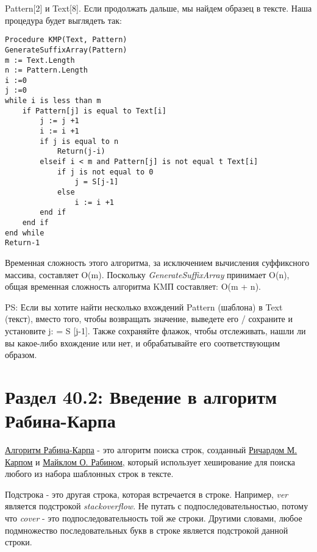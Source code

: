 Pattern[2] и Text[8]. Если продолжать дальше, мы найдем образец в тексте. Наша процедура
будет выглядеть так:
\vspace{\baselineskip}
\begin{tcolorbox}
\begin{verbatim}
Procedure KMP(Text, Pattern)
GenerateSuffixArray(Pattern)
m := Text.Length
n := Pattern.Length
i :=0
j :=0
while i is less than m
	if Pattern[j] is equal to Text[i]
		j := j +1
		i := i +1
		if j is equal to n
			Return(j-i)
		elseif i < m and Pattern[j] is not equal t Text[i]
			if j is not equal to 0
				j = S[j-1]
			else
				i := i +1
		end if
	end if
end while
Return-1
\end{verbatim}
\end{tcolorbox}
\vspace{\baselineskip}
Временная сложность этого алгоритма, за исключением вычисления суффиксного массива,
составляет O(m). Поскольку \textit{GenerateSuffixArray} принимает O(n), общая временная сложность
алгоритма KMП составляет: O(m + n).
\vspace{\baselineskip}

PS: Если вы хотите найти несколько вхождений Pattern (шаблона) в Text (текст), вместо того,
чтобы возвращать значение, выведете его / сохраните и установите j: = S [j-1]. Также
сохраняйте флажок, чтобы отслеживать, нашли ли вы какое-либо вхождение или нет, и
обрабатывайте его соответствующим образом.

\section*{Раздел 40.2: Введение в алгоритм Рабина-Карпа}
\href{https://en.wikipedia.org/wiki/Rabin%
}{\underline{Алгоритм Рабина-Карпа}}
- это алгоритм поиска строк, созданный \href{https://en.wikipedia.org/wiki/Richard_M._Karp}{\underline{Ричардом М. Карпом}} и \newline
\href{https://en.wikipedia.org/wiki/Michael_O._Rabin}{\underline{Майклом О. Рабином}}, который использует хеширование для поиска любого из набора
шаблонных строк в тексте.
\vspace{\baselineskip}

Подстрока - это другая строка, которая встречается в строке. Например, \textit{ver} является
подстрокой \textit{stackoverflow}. Не путать с подпоследовательностью, потому что \textit{cover} - это
подпоследовательность той же строки. Другими словами, любое подмножество
последовательных букв в строке является подстрокой данной строки.
\vspace{\baselineskip}

